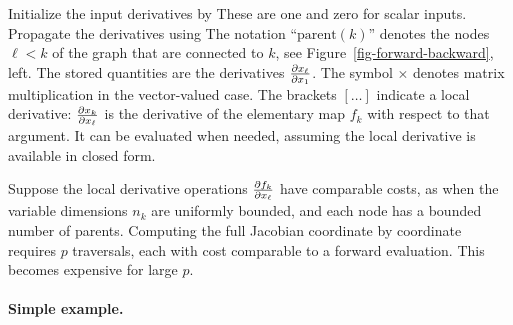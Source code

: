 Initialize the input derivatives by
These are one and zero for scalar inputs. Propagate the derivatives using
The notation ``$\text{parent}(k)$'' denotes the nodes $\ell<k$ of the graph that are connected to $k$, see Figure~\ref{fig-forward-backward}, left. 
%
The stored quantities are the derivatives $\frac{ \partial x_\ell}{\partial x_1}$. The symbol $\times$ denotes matrix multiplication in the vector-valued case.
%
The brackets $[\ldots]$ indicate a local derivative: $\frac{ \partial x_k}{\partial x_\ell}$ is the derivative of the elementary map $f_k$ with respect to that argument. It can be evaluated when needed, assuming the local derivative is available in closed form.

Suppose the local derivative operations $\frac{ \partial f_k}{\partial x_\ell}$ have comparable costs, as when the variable dimensions $n_k$ are uniformly bounded, and each node has a bounded number of parents. Computing the full Jacobian coordinate by coordinate requires $p$ traversals, each with cost comparable to a forward evaluation. This becomes expensive for large $p$.



\paragraph{Simple example.}


